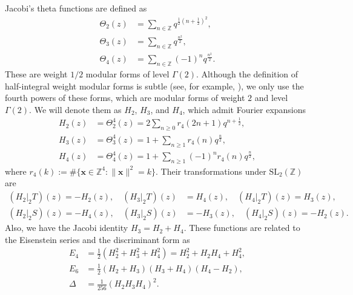 \documentclass[10pt,reqno]{amsproc}
\newcommand{\1}{\mathds{1}}	%
\theoremstyle{definition}
\theoremstyle{remark}
\begin{document}
Jacobi's theta functions are defined as
\begin{align*}
    \Theta_2(z) &= \sum_{n \in \mathbb{Z}} q^{\frac{1}{2}(n + \frac{1}{2})^2}, \\
    \Theta_3(z) &= \sum_{n \in \mathbb{Z}} q^{\frac{n^2}{2}}, \\
    \Theta_4(z) &= \sum_{n \in \mathbb{Z}} (-1)^{n}q^{ \frac{n^2}{2}}.
\end{align*}
These are weight $1/2$ modular forms of level $\Gamma(2)$.
Although the definition of half-integral weight modular forms is subtle (see, for example, \cite{shimura1973modular}), we only use the fourth powers of these forms, which are modular forms of weight $2$ and level $\Gamma(2)$.
We will denote them as $H_2$, $H_3$, and $H_4$, which admit Fourier expansions
\begin{align*}
    H_2(z) &= \Theta_2^4(z) = 2 \sum_{n \geq 0} r_4(2n + 1) q^{n + \frac{1}{2}}, \\
    H_3(z) &= \Theta_3^4(z) = 1 + \sum_{n \geq 1}  r_4(n)q^{\frac{n}{2}}, \\
    H_4(z) &= \Theta_4^4(z) = 1 + \sum_{n \geq 1} (-1)^{n} r_4(n)q^{\frac{n}{2}},
\end{align*}
where $r_4(k) := \# \{ \mathbf{x} \in \mathbb{Z}^{4}: \|\mathbf{x}\|^2 = k\}$.
Their transformations under $\mathrm{SL}_2(\mathbb{Z})$ are
\begin{align*}
    (H_{2}|_{2}T)(z) = -H_{2}(z), \quad (H_{3}|_{2}T)(z) &= H_{4}(z), \quad (H_{4}|_{2}T)(z) = H_{3}(z), \\
    (H_{2}|_{2}S)(z) = -H_{4}(z), \quad (H_{3}|_{2}S)(z) &= -H_{3}(z), \quad (H_{4}|_{2}S)(z) = -H_{2}(z).
\end{align*}
Also, we have the Jacobi identity $H_{3} = H_{2} + H_{4}$.
These functions are related to the Eisenstein series and the discriminant form as
\begin{align}
    E_4 &= \frac{1}{2}(H_{2}^{2} + H_{3}^{2} + H_{4}^{2}) = H_{2}^{2} + H_{2}H_{4} + H_{4}^{2}, \label{eqn:e4theta} \\
    E_6 &= \frac{1}{2} (H_{2} + H_{3})(H_{3} + H_{4}) (H_{4} - H_{2}), \label{eqn:e6theta} \\
    \Delta &= \frac{1}{256} (H_{2}H_{3}H_{4})^2. \label{eqn:disctheta}
\end{align}
\end{document}
